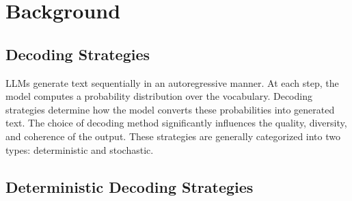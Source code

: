 \section{Background}
\label{background}

\subsection{Decoding Strategies}

LLMs generate text sequentially in an autoregressive manner. At each step, the model computes a probability distribution over the vocabulary. Decoding strategies determine how the model converts these probabilities into generated text. The choice of decoding method significantly influences the quality, diversity, and coherence of the output. These strategies are generally categorized into two types: deterministic and stochastic.

\subsection{Deterministic Decoding Strategies}
\label{deterministic decoding}

